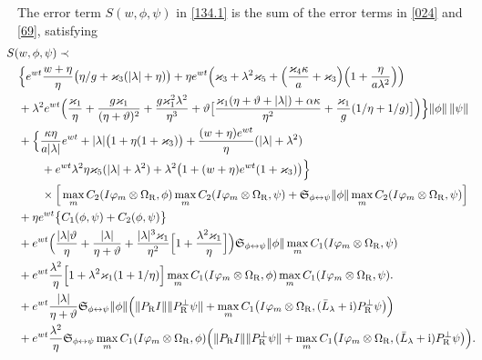 \documentclass[letterpaper,onecolumn,11pt,accepted=2021-12-09]{quantumarticle}
\numberwithin{equation}{section}
\newcommand{\sym}{ {\mathfrak S}_{\phi\leftrightarrow\psi}}
\renewcommand{\r}{{\rm R}}
\renewcommand{\i}{{\rm i}}
\begin{document}
The error term $S(w,\phi,\psi)$  in \eqref{134.1} is the sum of the error terms in \eqref{024} and \eqref{69}, satisfying
\begin{align}
& \!\!\!\!\!\! S(w,\phi,\psi) \prec  \\
& \Big\{ e^{wt}\frac{w +\eta}{\eta} \big( \eta/g+ \varkappa_3 (|\lambda|+\eta)\big)  +  \eta e^{wt}\Big( \varkappa_3+\lambda^2\varkappa_5 + \Big( \frac{\varkappa_4\kappa}{a} +\varkappa_3\Big)  \Big( 1+\frac{\eta}{a\lambda^2}\Big) \Big) \nonumber\\
& +\lambda^2 e^{wt}\Big( \frac{\varkappa_1}{\eta}+ \frac{g\varkappa_1}{(\eta+\vartheta)^2} + \frac{g\varkappa^2_1\lambda^2}{\eta^3} +\vartheta \big[\frac{\varkappa_1(\eta+\vartheta+|\lambda|)+\alpha\kappa}{\eta^2} +\frac{\varkappa_1}{g}(1/\eta +1/g)\big] \Big)
\Big\} \|\phi\|\, \|\psi\|	\nonumber\\
&+ \Big\{ 
 \frac{\kappa\eta}{a|\lambda|} e^{wt} + |\lambda|\big( 1 +\eta(1+\varkappa_3)\big)+ \frac{(w+\eta) e^{wt}}{\eta} ( |\lambda| +\lambda^2)\nonumber\\
&\qquad + e^{wt}\lambda^2\eta\varkappa_5(|\lambda|+\lambda^2)+ \lambda^2 \big( 1+ (w+\eta) e^{wt}(1+\varkappa_3)  \big)\Big\} \nonumber\\
& \qquad \times \Big[\max_m C_2(I\varphi_m\otimes\Omega_\r,\phi) \max_m C_2(I\varphi_m\otimes\Omega_\r,\psi)+  \sym \|\phi\| \max_mC_2(I\varphi_m\otimes\Omega_\r, \psi) \Big] \nonumber\\
& +\eta e^{wt} \big\{ C_1(\phi,\psi) + C_2(\phi,\psi)\big\}\nonumber \\
& +  e^{wt} \Big( \frac{|\lambda|\vartheta}{\eta} + \frac{|\lambda|}{\eta+\vartheta} +\frac{|\lambda|^3\varkappa_1}{\eta^2} \Big[ 1+\frac{\lambda^2\varkappa_1}{\eta}\Big] \Big)\sym \|\phi\|  \max_m C_1(I\varphi_m\otimes\Omega_\r,\psi)  \nonumber \\
&  +e^{wt}\frac{\lambda^2}{\eta} \Big[1+\lambda^2\varkappa_1(1+1/\eta) \Big]\max_m C_1(I\varphi_m\otimes\Omega_\r, \phi)  \max_mC_1(I\varphi_m\otimes \Omega_\r,\psi).\nonumber\\
&  + e^{wt}\frac{|\lambda| }{\eta+\vartheta} \sym \|\phi\| \Big(  \|P_\r I\|  \|P^\perp_\r\psi\|+ \max_m C_1\big(I\varphi_m\otimes\Omega_\r,(\bar L_\lambda+\i)P^\perp_\r\psi\big) \Big)\nonumber\\
&  + e^{wt}\frac{\lambda^2}{\eta}  \sym \max_m C_1(I\varphi_m\otimes\Omega_\r, \phi)\Big( \|P_\r I\| \|P^\perp_\r\psi\| + \max_m C_1\big(I\varphi_m\otimes\Omega_\r,(\bar L_\lambda+\i)P^\perp_\r\psi\big)\Big).\nonumber
\end{align}
\end{document}
